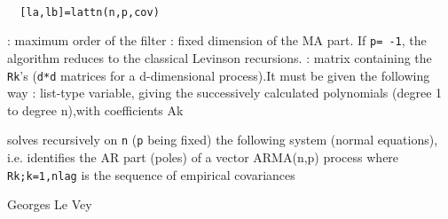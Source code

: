 
\begin{mandesc}
   \\ %
\end{mandesc}
\begin{calling_sequence}
\begin{verbatim}
  [la,lb]=lattn(n,p,cov)  
\end{verbatim}
\end{calling_sequence}
\begin{parameters}
  \begin{varlist}
    : maximum order of the filter
    : fixed dimension of the MA part. If \verb!p= -1!, the algorithm reduces to the classical Levinson recursions.
    : matrix containing the \verb!Rk!'s (\verb!d*d! matrices for a d-dimensional process).It must be given the following way
    : list-type variable, giving the successively calculated polynomials (degree 1 to degree n),with coefficients Ak
  \end{varlist}
\end{parameters}
\begin{mandescription}
  solves recursively on \verb!n! (\verb!p! being fixed)
  the following system (normal equations), i.e. identifies
  the AR part (poles) of a vector ARMA(n,p) process
  where {\verb!Rk;k=1,nlag!} is the sequence of empirical covariances
\end{mandescription}
\begin{authors}
  Georges Le Vey
\end{authors}
